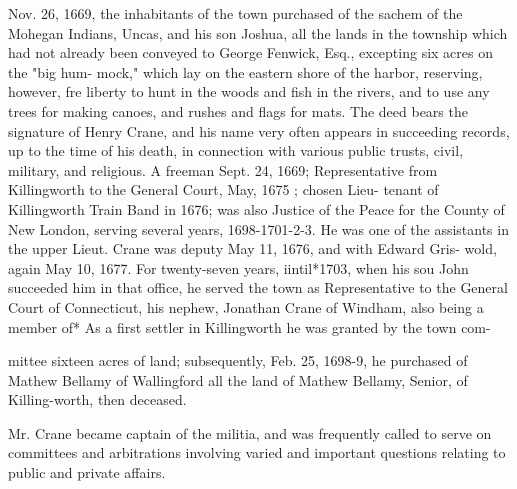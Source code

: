 \documentclass{book}
\begin{document}
Nov. 26, 1669, the inhabitants of the town purchased of the 
sachem of the Mohegan Indians, Uncas, and his son Joshua, all 
the lands in the township which had not already been conveyed to 
George Fenwick, Esq., excepting six acres on the "big hum- 
mock," which lay on the eastern shore of the harbor, reserving, 
however, fre liberty to hunt in the woods and fish in the rivers, 
and to use any trees for making canoes, and rushes and flags for 
mats. The deed bears the signature of Henry Crane, and his 
name very often appears in succeeding records, up to the time of 
his death, in connection with various public trusts, civil, military, 
and religious. A freeman Sept. 24, 1669; Representative from 
Killingworth to the General Court, May, 1675 ; chosen Lieu- 
tenant of Killingworth Train Band in 1676; was also Justice of 
the Peace for the County of New London, serving several years, 
1698-1701-2-3. He was one of the assistants in the upper 
Lieut. Crane was deputy May 11, 1676, and with Edward Gris- 
wold, again May 10, 1677. For twenty-seven years, iintil*1703, 
when his sou John succeeded him in that office, he served the 
town as Representative to the General Court of Connecticut, his 
nephew, Jonathan Crane of Windham, also being a member of* 
As a first settler in Killingworth he was granted by the town com- 




mittee sixteen acres of land; subsequently, Feb. 25, 1698-9, he 
purchased of Mathew Bellamy of Wallingford all the land of 
Mathew Bellamy, Senior, of Killing-worth, then deceased. 

Mr. Crane became captain of the militia, and was frequently 
called to serve on committees and arbitrations involving varied 
and important questions relating to public and private affairs. 
\end{document}
